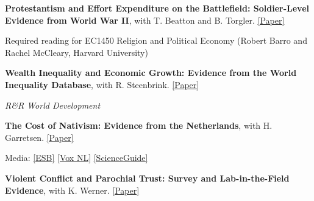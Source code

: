 \documentclass[letterpaper]{article}
\renewenvironment{itemize}{
  \begin{list}{}{
    \setlength{\leftmargin}{1.5em}
  }
}{
  \end{list}
}
\begin{document}
				\begin{itemize}
				
					\item \textbf{Protestantism and Effort Expenditure on the Battlefield: Soldier-Level Evidence from World War II}, with T. Beatton and B. Torgler. \href{https://ahmedskali.com/papers/ProtestantSoldiersAug2024.pdf}{[Paper]}
	
	\begin{itemize}
		\item 	Required reading for EC1450 Religion and Political Economy (Robert Barro and Rachel McCleary, Harvard University)
		\end{itemize}
		
		\medskip
				
						\item \textbf{Wealth Inequality and Economic Growth: Evidence from the World Inequality Database}, with R. Steenbrink.  \href{https://www.econstor.eu/handle/10419/289584}{[Paper]}
 
						\begin{itemize}
							\item \textit{R\&R World Development}
							\end{itemize}
	

	
		\medskip
	
		\item {\bf The Cost of Nativism: Evidence from the Netherlands}, with H. Garretsen. 
 \href{https://ahmedskali.com/papers/LanguagePaper.pdf}{[Paper]}
 
 \begin{itemize}
 
 	\item Media: \href{https://esb.nu/nederlands-schaadt-economie/}{[ESB]}  \href{https://www.voxweb.nl/nieuws/geen-colleges-meer-in-het-engels-kost-nederland-veel-geld-op-de-lange-termijn?medium=email}{[Vox NL]}	\href{https://www.scienceguide.nl/2024/10/meer-nederlands-in-hoger-onderwijs-kost-ons-land-veel-welvaart-toont-rug-onderzoek/}{[ScienceGuide]}
	
	\end{itemize}
	
	\medskip
	
		\item \textbf{Violent Conflict and Parochial Trust: Survey and Lab-in-the-Field Evidence}, with K. Werner. \href{https://papers.ssrn.com/sol3/papers.cfm?abstract_id=4294035}{[Paper]}
	
\medskip
	

\end{itemize}
\end{document}
